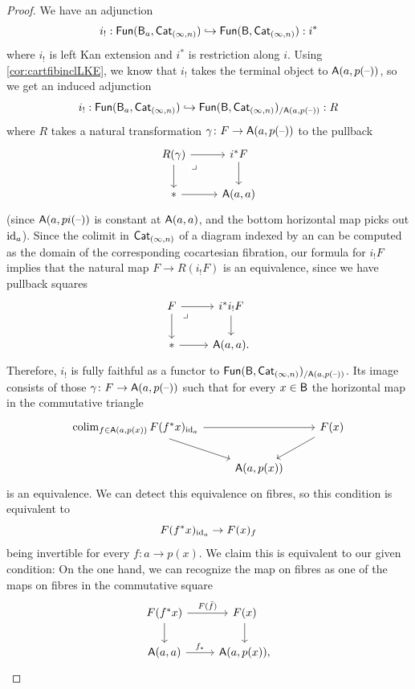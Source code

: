 \documentclass[a4paper,11pt]{article}
\begin{document}
\begin{proof}
  We have an adjunction
  \[ i_{!} : \textup{\textsf{Fun}}(\textup{\textsf{B}}_{a}, \textup{\textsf{Cat}}_{(\infty,n)}) \hookrightarrow \textup{\textsf{Fun}}(\textup{\textsf{B}},
    \textup{\textsf{Cat}}_{(\infty,n)}) : i^{*} \]
  where $i_{!}$ is left Kan extension and $i^{*}$ is restriction along
  $i$. Using \cref{cor:cartfibinclLKE}, we know that $i_{!}$ takes
  the terminal object to $\textup{\textsf{A}}(a,p(\text{\textendash}))$, so we get an induced
  adjunction
  \[ i_{!} : \textup{\textsf{Fun}}(\textup{\textsf{B}}_{a}, \textup{\textsf{Cat}}_{(\infty,n)}) \hookrightarrow \textup{\textsf{Fun}}(\textup{\textsf{B}},
    \textup{\textsf{Cat}}_{(\infty,n)})_{/\textup{\textsf{A}}(a, p(\text{\textendash}))} : R \]
  where $R$ takes a natural transformation $\gamma \colon F \to \oA(a, p(\blank))$
  to the pullback
  \[
    \begin{tikzcd}
      R(\gamma) \ar[r] \ar[d] \drpullback & i^{*}F \ar[d] \\
      * \ar[r] & \oA(a, a)
    \end{tikzcd}
  \]
  (since $\textup{\textsf{A}}(a, pi(\text{\textendash}))$ is constant at $\textup{\textsf{A}}(a,a)$, and the
  bottom horizontal map picks out $\text{\textup{id}}_{a}$).
  Since the colimit in $\textup{\textsf{Cat}}_{(\infty,n)}$ of a diagram indexed by an \igpd{} can be computed as the
  domain of the corresponding cocartesian fibration, our formula for
  $i_{!}F$ implies that the natural map $F \to R(i_{!}F)$ is an
  equivalence, since we have pullback squares
  \[
    \begin{tikzcd}
      F \ar[r] \ar[d] \drpullback & i^{*}i_{!}F \ar[d] \\
      * \ar[r] & \oA(a, a).
    \end{tikzcd}
  \]
  Therefore, $i_{!}$ is fully faithful as a functor to
  $\textup{\textsf{Fun}}(\textup{\textsf{B}}, \textup{\textsf{Cat}}_{(\infty,n)})_{/\textup{\textsf{A}}(a, p(\text{\textendash}))}$. Its image consists of
  those $\gamma \colon F \to \oA(a,p(\blank))$ such that for every $x
  \in \textup{\textsf{B}}$ the horizontal map in the commutative triangle
  \[
    \begin{tikzcd}
      \colim_{f \in \oA(a,p(x))} F(f^{*}x)_{\id_{a}} \ar[rr] \ar[dr] &  & F(x)
      \ar[dl] \\
       & \oA(a,p(x))
    \end{tikzcd}
  \]
  is an equivalence. We can detect this equivalence on fibres, so this
  condition is equivalent to
  \[ F(f^{*}x)_{\id_{a}} \to F(x)_{f}\]
  being invertible for every $f \colon a \to p(x)$. We claim this is
  equivalent to our given condition: On the one hand, we can recognize
  the map on fibres as one of the maps on fibres in the commutative
  square
    \[
    \begin{tikzcd}
      F(f^{*}x) \ar[r, "F(\bar{f})"] \ar[d] & F(x) \ar[d]  \\
      \oA(a,a) \ar[r, "f_{*}"] & \oA(a,p(x)),
    \end{tikzcd}
\]
\end{proof}
\end{document}
